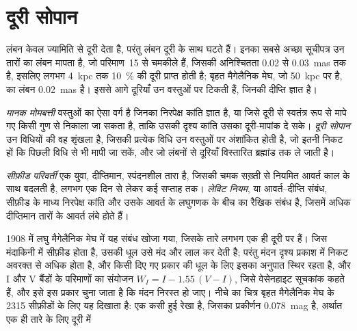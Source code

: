 \section{दूरी सोपान}\label{sec:b3:milky-way-galaxies:ladder}

लंबन केवल ज्यामिति से दूरी देता है, परंतु लंबन दूरी के साथ
घटते हैं। इनका सबसे अच्छा सूचीपत्र उन तारों का लंबन मापता है, जो परिमाण~15 से चमकीले हैं,
जिसकी अनिश्चितता 0.02 से \qty{0.03}{mas} तक है, इसलिए
लगभग \qty{4}{kpc} तक \qty{10}{\percent} की दूरी प्राप्त होती है; बृहत मैगेलैनिक मेघ,
जो \qty{50}{kpc} पर है, का लंबन \qty{0.02}{mas} है।
इससे आगे दूरियाँ उन वस्तुओं पर टिकती हैं, जिनकी
दीप्ति ज्ञात है।

\begin{definition}[मानक मोमबत्ती; दूरी सोपान]\label{def:b3:milky-way-galaxies:ladder}
\emph{मानक मोमबत्ती} वस्तुओं का ऐसा वर्ग है
जिनका निरपेक्ष कांति ज्ञात है, या जिसे दूरी से स्वतंत्र रूप से मापे गए किसी गुण से निकाला जा सकता है,
ताकि उसकी दृश्य कांति उसका दूरी-मापांक दे सके।
\emph{दूरी सोपान} उन विधियों की वह शृंखला है,
जिसकी प्रत्येक विधि उन वस्तुओं पर अंशांकित होती है, जो इतनी निकट हों कि
पिछली विधि से भी मापी जा सकें, और जो लंबनों से दूरियाँ
विस्तारित ब्रह्मांड तक ले जाती है।
\end{definition}

\begin{definition}[सीफ़ीड परिवर्ती; लेविट नियम]\label{def:b3:milky-way-galaxies:cepheid}
\emph{सीफ़ीड परिवर्ती} एक युवा, दीप्तिमान,
स्पंदनशील तारा है, जिसकी चमक सख़्ती से नियमित आवर्त काल के साथ बदलती है,
लगभग एक दिन से लेकर कई सप्ताह तक। \emph{लेविट नियम},
या आवर्त--दीप्ति संबंध, सीफ़ीड के माध्य निरपेक्ष कांति और उसके आवर्त के लघुगणक के बीच
का रैखिक संबंध है, जिसमें अधिक दीप्तिमान तारों के
आवर्त लंबे होते हैं।
\end{definition}

1908 में लघु मैगेलैनिक मेघ में यह संबंध खोजा गया, जिसके तारे
लगभग एक ही दूरी पर हैं। जिस मंदाकिनी में सीफ़ीड होता है, उसकी धूल
उसे मंद और लाल कर देती है; परंतु मंदन दृश्य प्रकाश में निकट अवरक्त से अधिक होता है,
और किसी दिए गए प्रकार की धूल के लिए इसका अनुपात स्थिर रहता है, और I और V बैंडों के परिमाणों का संयोजन $W_I = I - 1.55\,(V - I)$, जिसे
वेसेनहाइट सूचकांक कहते हैं, और इसे इस प्रकार चुना जाता है कि मंदन
निरस्त हो जाए। नीचे का चित्र बृहत मैगेलैनिक मेघ के 2315 सीफ़ीडों के लिए यह दिखाता है:
 एक कसी हुई रेखा है, जिसका प्रकीर्णन
\qty{0.078}{mag} है, अर्थात एक ही तारे के लिए दूरी में

